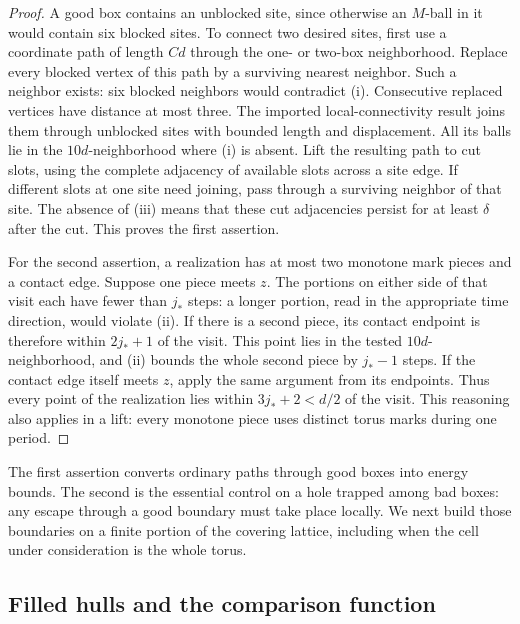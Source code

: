 \begin{proof}
A good box contains an unblocked site, since otherwise an $M$-ball
in it would contain six blocked sites.  To connect two desired
sites, first use a coordinate path of length $C d$ through the
one- or two-box neighborhood.  Replace every blocked vertex of
this path by a surviving nearest neighbor.  Such a neighbor exists:
six blocked neighbors would contradict (i).  Consecutive replaced
vertices have distance at most three.  The imported local-connectivity
result joins them through unblocked sites with bounded length and
displacement.  All its balls lie in the $10d$-neighborhood where
(i) is absent.  Lift the resulting path to cut slots, using the
complete adjacency of available slots across a site edge.  If
different slots at one site need joining, pass through a surviving
neighbor of that site.  The absence of (iii) means that these cut
adjacencies persist for at least $\delta$ after the cut.  This
proves the first assertion.

For the second assertion, a realization has at most two monotone
mark pieces and a contact edge.  Suppose one piece meets $z$.
The portions on either side of that visit each have fewer than
$j_*$ steps: a longer portion, read in the appropriate time
direction, would violate (ii).  If there is a second piece, its
contact endpoint is therefore within $2j_*+1$ of the visit.
This point lies in the tested $10d$-neighborhood, and (ii) bounds
the whole second piece by $j_*-1$ steps.  If the contact edge
itself meets $z$, apply the same argument from its endpoints.
Thus every point of the realization lies within $3j_*+2<d/2$
of the visit.  This reasoning also applies in a lift: every
monotone piece uses distinct torus marks during one period.
\end{proof}

The first assertion converts ordinary paths through good boxes into
energy bounds.  The second is the essential control on a hole trapped
among bad boxes: any escape through a good boundary must take place
locally.  We next build those boundaries on a finite portion of the
covering lattice, including when the cell under consideration is the
whole torus.

\subsection{Filled hulls and the comparison function}

